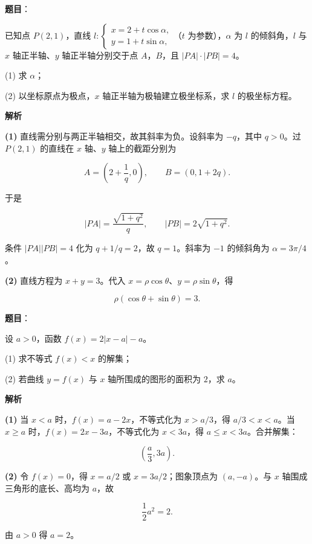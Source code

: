 \begin{answer}

\textbf{题目}：

已知点 $P(2,1)$，直线 $l:\begin{cases}x=2+t\cos\alpha,\\y=1+t\sin\alpha,\end{cases}$（$t$ 为参数），$\alpha$ 为 $l$ 的倾斜角，$l$ 与 $x$ 轴正半轴、$y$ 轴正半轴分别交于点 $A$，$B$，且 $|PA|\cdot|PB|=4$。

  (1) 求 $\alpha$；

  (2) 以坐标原点为极点，$x$ 轴正半轴为极轴建立极坐标系，求 $l$ 的极坐标方程。

\textbf{解析}

\textbf{(1)} 直线需分别与两正半轴相交，故其斜率为负。设斜率为 $-q$，其中 $q>0$。过 $P(2,1)$ 的直线在 $x$ 轴、$y$ 轴上的截距分别为

\nopagebreak[4]
\[
A=\left(2+\frac1q,0\right),\qquad B=(0,1+2q).
\]

于是

\nopagebreak[4]
\[
|PA|=\frac{\sqrt{1+q^2}}q,\qquad |PB|=2\sqrt{1+q^2}.
\]

条件 $|PA||PB|=4$ 化为 $q+1/q=2$，故 $q=1$。斜率为 $-1$ 的倾斜角为 $\alpha=3\pi/4$。

\textbf{(2)} 直线方程为 $x+y=3$。代入 $x=\rho\cos\theta$、$y=\rho\sin\theta$，得

\nopagebreak[4]
\[
\rho(\cos\theta+\sin\theta)=3.
\]



\end{answer}
\begin{answer}

\textbf{题目}：

设 $a>0$，函数 $f(x)=2|x-a|-a$。

  (1) 求不等式 $f(x)<x$ 的解集；

  (2) 若曲线 $y=f(x)$ 与 $x$ 轴所围成的图形的面积为 $2$，求 $a$。

\textbf{解析}

\textbf{(1)} 当 $x<a$ 时，$f(x)=a-2x$，不等式化为 $x>a/3$，得 $a/3<x<a$。当 $x\geqslant a$ 时，$f(x)=2x-3a$，不等式化为 $x<3a$，得 $a\leqslant x<3a$。合并解集：

\nopagebreak[4]
\[
\left(\frac a3,3a\right).
\]

\textbf{(2)} 令 $f(x)=0$，得 $x=a/2$ 或 $x=3a/2$；图象顶点为 $(a,-a)$。与 $x$ 轴围成三角形的底长、高均为 $a$，故

\nopagebreak[4]
\[
\frac12a^2=2.
\]

由 $a>0$ 得 $a=2$。



\end{answer}